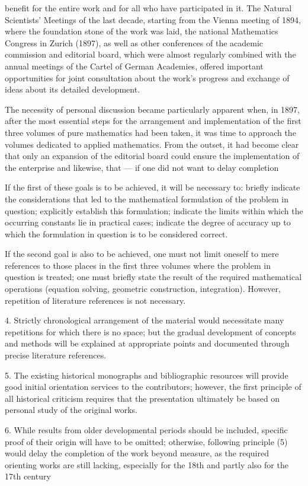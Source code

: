\thispagestyle{fancy}

\vspace{0.5cm}

benefit for the entire work and for all who have participated in it. The Natural Scientists' Meetings of the last decade, starting from the Vienna meeting of 1894, where the foundation stone of the work was laid, the national Mathematics Congress in Zurich (1897), as well as other conferences of the academic commission and editorial board, which were almost regularly combined with the annual meetings of the Cartel of German Academies, offered important opportunities for joint consultation about the work's progress and exchange of ideas about its detailed development.

The necessity of personal discussion became particularly apparent when, in 1897, after the most essential steps for the arrangement and implementation of the first three volumes of pure mathematics had been taken, it was time to approach the volumes dedicated to applied mathematics. From the outset, it had become clear that only an expansion of the editorial board could ensure the implementation of the enterprise and likewise, that — if one did not want to delay completion

\vfill
\leftline{\rule{2in}{0.4pt}}
\vspace{0.2cm}
{\footnotesize If the first of these goals is to be achieved, it will be necessary to: briefly indicate the considerations that led to the mathematical formulation of the problem in question; explicitly establish this formulation; indicate the limits within which the occurring constants lie in practical cases; indicate the degree of accuracy up to which the formulation in question is to be considered correct.

If the second goal is also to be achieved, one must not limit oneself to mere references to those places in the first three volumes where the problem in question is treated; one must briefly state the result of the required mathematical operations (equation solving, geometric construction, integration). However, repetition of literature references is not necessary.

4. Strictly chronological arrangement of the material would necessitate many repetitions for which there is no space; but the gradual development of concepts and methods will be explained at appropriate points and documented through precise literature references.

5. The existing historical monographs and bibliographic resources will provide good initial orientation services to the contributors; however, the first principle of all historical criticism requires that the presentation ultimately be based on personal study of the original works.

6. While results from older developmental periods should be included, specific proof of their origin will have to be omitted; otherwise, following principle (5) would delay the completion of the work beyond measure, as the required orienting works are still lacking, especially for the 18th and partly also for the 17th century

}
